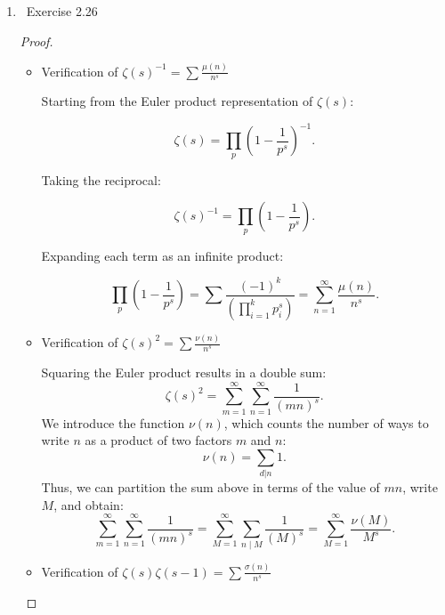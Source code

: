\documentclass[11pt]{article}
\newcommand\0{\mathbf{0}}
\newcommand\<{\langle}
\renewcommand\>{\rangle}
\begin{document}
\begin{enumerate}
\begin{proof}
    Next, we recover the Dirichlet series definition of the Riemann zeta function:
    
    \begin{eqnarray}
        \zeta(s) = \sum_{n=1}^{\infty} \frac{1}{n^s}.
    \end{eqnarray}
    
    Now, consider the alternative product expansion since each \( n \) can be uniquely factored as \( n = p_1^{e_1} p_2^{e_2} \cdots p_k^{e_k} \):
    \begin{eqnarray}
        \sum_{n=1}^{\infty} \frac{1}{n^s} = \sum_{n=1}^{\infty} \frac{1}{\prod_{i=1}^{N_n} (p_i^s)^{e_i}}.
    \end{eqnarray}
    
    
    We see that this expansion matches the right-hand side of the Euler product in equation \eqref{zeta}, establishing the connection between the two representations of \( \zeta(s) \).
    
\end{proof}
\item\ Exercise  2.26
\begin{proof}
\begin{itemize}
    \item{Verification of \( \zeta(s)^{-1} = \sum \frac{\mu(n)}{n^s} \)}

Starting from the Euler product representation of \( \zeta(s) \):

\[
\zeta(s) = \prod_{p} \left( 1 - \frac{1}{p^s} \right)^{-1}.
\]

Taking the reciprocal:

\[
\zeta(s)^{-1} = \prod_{p} \left( 1 - \frac{1}{p^s} \right).
\]

Expanding each term as an infinite product:

\[
\prod_{p} \left( 1 - \frac{1}{p^s} \right) = \sum \frac{(-1)^k}{(\prod_{i=1}^{k}{p_i^s})}= \sum_{n=1}^{\infty} \frac{\mu(n)}{n^s}.
\]

\item{Verification of \( \zeta(s)^2 = \sum \frac{\nu(n)}{n^s} \)}

Squaring the Euler product results in a double sum:
\[
\zeta(s)^2 = \sum_{m=1}^{\infty} \sum_{n=1}^{\infty} \frac{1}{(mn)^s}.
\]
We introduce the function \( \nu(n) \), which counts the number of ways to write \( n \) as a product of two factors \( m \) and \( n \):
\[
\nu(n) = \sum_{d|n} 1.
\]
Thus, we can partition the sum above in terms of the value of $mn$, write $M$, and obtain:
\[
    \sum_{m=1}^{\infty} \sum_{n=1}^{\infty} \frac{1}{(mn)^s} = 
    \sum_{M=1}^{\infty} \sum_{n\mid M} \frac{1}{(M)^s} = 
    \sum_{M=1}^{\infty} \frac{\nu(M)}{M^s}.
\]
\item{Verification of \( \zeta(s) \zeta(s-1) = \sum \frac{\sigma(n)}{n^s} \)}


\end{itemize}
\end{proof}
\end{enumerate}
\end{document}

